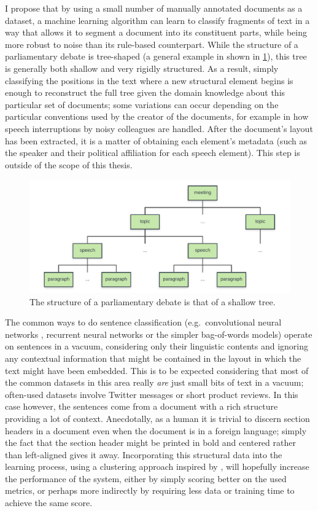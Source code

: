 I propose that by using a small number of manually annotated documents as a
dataset, a machine learning algorithm can learn to classify fragments of text in
a way that allows it to segment a document into its constituent parts, while
being more robust to noise than its rule-based counterpart. While the structure
of a parliamentary debate is tree-shaped (a general example in shown in
\cref{fig:tree}), this tree is generally both shallow and very rigidly
structured. As a result, simply classifying the positions in the text where a
new structural element begins is enough to reconstruct the full tree given the
domain knowledge about this particular set of documents; some variations can
occur depending on the particular conventions used by the creator of the
documents, for example in how speech interruptions by noisy colleagues are
handled. After the document's layout has been extracted, it is a matter of
obtaining each element's metadata (such as the speaker and their political
affiliation for each speech element). This step is outside of the scope of this
thesis.
\begin{figure}[tb]
  \centering
  \includegraphics[width=\textwidth]{figures/tree.pdf}
  \caption{The structure of a parliamentary debate is that of a shallow
    tree.\label{fig:tree}}
\end{figure}

The common ways to do sentence classification (e.g.\ convolutional neural
networks \citep{kim2014conv}, recurrent neural networks or the simpler
bag-of-words models) operate on sentences in a vacuum, considering only their
linguistic contents and ignoring any contextual information that might be
contained in the layout in which the text might have been embedded. This is to
be expected considering that most of the common datasets in this area really
\emph{are} just small bits of text in a vacuum; often-used datasets involve
Twitter messages or short product reviews. In this case however, the sentences
come from a document with a rich structure providing a lot of context.
Anecdotally, as a human it is trivial to discern section headers in a document
even when the document is in a foreign language; simply the fact that the
section header might be printed in bold and centered rather than left-aligned
gives it away.  Incorporating this structural data into the learning process,
using a clustering approach inspired by \textcite{klampfl2014unsupervised},
will hopefully increase the performance of the system, either by simply scoring
better on the used metrics, or perhaps more indirectly by requiring less data or
training time to achieve the same score.

